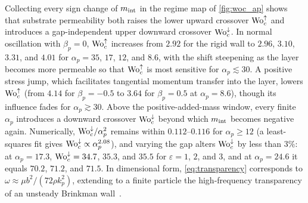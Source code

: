 Collecting every sign change of $m_{\rm int}$ in the regime map of \cref{fig:woc_ap} shows that substrate permeability both raises the lower
upward crossover $\mathrm{Wo}_c^{\uparrow}$ and introduces a gap-independent upper downward crossover $\mathrm{Wo}_c^{\downarrow}$. In
normal oscillation with $\beta_p=0$, $\mathrm{Wo}_c^{\uparrow}$ increases from $2.92$ for the rigid wall to $2.96$, $3.10$, $3.31$,
and $4.01$ for $\alpha_p=35$, $17$, $12$, and $8.6$, with the shift steepening as the layer becomes more permeable so that
$\mathrm{Wo}_c^{\uparrow}$ is most sensitive for $\alpha_p\lesssim30$. A positive stress jump, which facilitates tangential
momentum transfer into the layer, lowers $\mathrm{Wo}_c^{\uparrow}$ (from $4.14$ for $\beta_p=-0.5$ to $3.64$ for $\beta_p=0.5$ at
$\alpha_p=8.6$), though its influence fades for $\alpha_p\gtrsim30$. Above the positive-added-mass window, every finite
$\alpha_p$ introduces a downward crossover $\mathrm{Wo}_c^{\downarrow}$ beyond which $m_{\rm int}$ becomes negative again.
Numerically, $\mathrm{Wo}_c^{\downarrow}/\alpha_p^2$ remains within $0.112$--$0.116$ for $\alpha_p\ge12$ (a least-squares fit
gives $\mathrm{Wo}_c^{\downarrow}\propto\alpha_p^{2.08}$), and varying the gap alters $\mathrm{Wo}_c^{\downarrow}$ by less than $3\%$: at
$\alpha_p=17.3$, $\mathrm{Wo}_c^{\downarrow}=34.7$, $35.3$, and $35.5$ for $\varepsilon=1$, $2$, and $3$, and at $\alpha_p=24.6$ it
equals $70.2$, $71.2$, and $71.5$.  In dimensional form, \cref{eq:transparency} corresponds to
$\omega\approx\mu b^2/(72\rho k_p^2)$, extending to a finite particle the high-frequency transparency of an unsteady
Brinkman wall~\cite{sherwood2020unsteady}.

